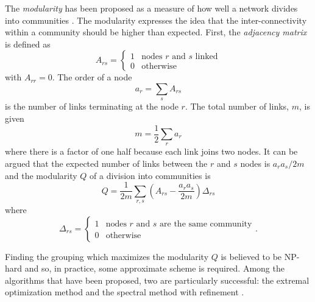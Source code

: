 \documentclass[12pt]{iopart}
\begin{document}
The {\sl modularity} has been proposed as a measure of how well a
network divides into communities \cite{GirvanNewman2002a}. The
modularity expresses the idea that the inter-connectivity within a
community should be higher than expected. First, the {\sl adjacency
  matrix} is defined as
\begin{equation}
A_{rs}=\left\{\begin{array}{ll}1&\mbox{nodes $r$ and $s$ linked}\\0&\mbox{otherwise}\end{array}\right.
\end{equation}
with $A_{rr}=0$. The order of a node
\begin{equation}
a_r=\sum_s A_{rs}
\end{equation}
is the number of links terminating at the node $r$. The total number of links, $m$, is given
\begin{equation}
m=\frac{1}{2}\sum_r a_r
\end{equation}
where there is a factor of one half because each link joins two
nodes. It can be argued that the expected number of links between
the $r$ and $s$ nodes is $a_ra_s/2m$ and the modularity $Q$ of a
division into communities is
\begin{equation}
Q=\frac{1}{2m}\sum_{r,s}\left(A_{rs}-\frac{a_ra_s}{2m}\right)\Delta_{rs}
\end{equation}
where 
\begin{equation}
\Delta_{rs}=\left\{\begin{array}{ll}1&\mbox{nodes $r$ and $s$ are the same community}\\0&\mbox{otherwise}\end{array}\right. .
\end{equation}

Finding the grouping which maximizes the modularity $Q$ is believed to
be NP-hard \cite{Newman2006b} and so, in practice, some approximate
scheme is required. Among the algorithms that have been proposed, two
are particularly successful: the extremal optimization method
\cite{DuchArenas2005a} and the spectral method with refinement
\cite{Newman2006a,Newman2006b}.
\end{document}
